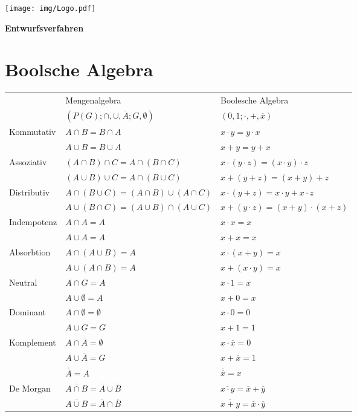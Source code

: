 \documentclass[6pt,a4paper]{scrartcl}
\renewcommand{\emph}[1]{\textsf{\textbf{#1}}}
\begin{document}
\newpage
\begin{multicols}{3}

\parbox{2.3cm}{
	\texttt{[image: img/Logo.pdf]}
}
\parbox{4cm}{
	\emph{\huge{Entwurfsverfahren}}
}

\setcounter{section}{0}			%

\section{Boolsche Algebra}
	\begin{tabular}{l|l|l}
		& Mengenalgebra & Boolesche Algebra \\ 
		& $(P(G);\cap , \cup, \overline{A};G,\emptyset )$ & $({0,1};\cdot , +, \overline{x})$ \\ \midrule
		Kommutativ 		& $A \cap B = B \cap A$ & $x \cdot y = y \cdot x$  \\ 
						& $A \cup B = B \cup A$ & $x + y = y + x$\\
		Assoziativ 		& $(A \cap B) \cap C = A \cap (B \cap C)$ & $x \cdot (y \cdot z) = (x \cdot y) \cdot z$\\
						& $(A \cup B) \cup C = A \cap (B \cup C)$ & $x + (y + z) = (x + y) + z$\\
		Distributiv 	& $A \cap (B \cup C) = (A \cap B) \cup (A \cap C)$ & $x \cdot (y + z) = x \cdot y + x \cdot z$\\
						& $A \cup (B \cap C) = (A \cup B) \cap (A \cup C)$ & $x + (y \cdot z) = (x + y) \cdot (x + z)$\\
		Indempotenz		& $A \cap A = A$ & $x \cdot x = x$ \\
						& $A \cup A = A$ & $x + x = x$\\
		Absorbtion		& $A \cap (A \cup B) = A$ & $x \cdot (x+y) = x$ \\
						& $A \cup (A \cap B) = A$ & $x + (x \cdot y) = x$ \\
		Neutral			& $A \cap G = A$ & $x \cdot 1 = x$ \\
						& $A \cup \emptyset = A$ & $x + 0 = x$ \\
		Dominant		& $A \cap \emptyset = \emptyset$ & $x \cdot 0 = 0$ \\
						& $A \cup G = G$ & $x + 1 = 1$ \\
		Komplement		& $A \cap \overline{A} = \emptyset$ & $x \cdot \overline{x} = 0$\\
						& $A \cup \overline{A} = G$ & $x + \overline{x} = 1$\\
						& $\overline{\overline{A}} = A$ & $\overline{\overline{x}} = x$\\
		De Morgan		& $\overline{A \cap B} = \overline{A} \cup \overline{B}$ & $\overline{x \cdot y} = \overline{x} + \overline{y}$\\
						& $\overline{A \cup B} = \overline{A} \cap \overline{B}$ & $\overline{x + y} = \overline{x} \cdot \overline{y}$\\


\end{tabular}
\end{multicols}
\end{document}
